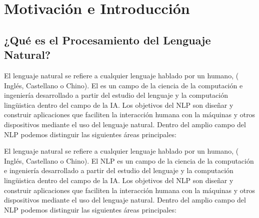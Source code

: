 \chapter{Motivación e Introducción}\label{ch:introduction}






\section{¿Qué es el Procesamiento del Lenguaje Natural?}
\label{sec:whatisnlp}

El lenguaje natural se refiere a cualquier lenguaje hablado por un humano, (\eg
Inglés, Castellano o Chino). El  es un
campo de la ciencia de la computación e ingeniería desarrollado a partir del
estudio del lenguaje y la computación lingüistica dentro del campo de la
\ac{IA}. Los objetivos del \ac{NLP} son diseñar y construir aplicaciones que
faciliten la interacción humana con la máquinas y otros dispositivos mediante el
uso del lenguaje natural. Dentro del amplio campo del \ac{NLP} podemos
distinguir las siguientes áreas principales:

El lenguaje natural se refiere a cualquier lenguaje hablado por un humano, (\eg
Inglés, Castellano o Chino). El \ac{NLP} es un campo de la
ciencia de la computación e ingeniería desarrollado a partir del estudio del
lenguaje y la computación lingüistica dentro del campo de la \ac{IA}. Los
objetivos del \ac{NLP} son diseñar y construir aplicaciones que faciliten la
interacción humana con la máquinas y otros dispositivos mediante el uso del
lenguaje natural. Dentro del amplio campo del \ac{NLP} podemos distinguir las
siguientes áreas principales:

